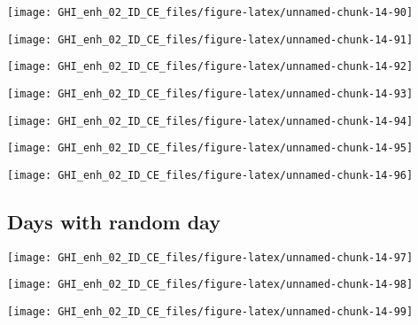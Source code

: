 \documentclass[
  10pt,
  a4paper,oneside]{article}
\begin{document}
\begin{center}\texttt{[image: GHI\_enh\_02\_ID\_CE\_files/figure-latex/unnamed-chunk-14-90]} \end{center}

\begin{center}\texttt{[image: GHI\_enh\_02\_ID\_CE\_files/figure-latex/unnamed-chunk-14-91]} \end{center}

\begin{center}\texttt{[image: GHI\_enh\_02\_ID\_CE\_files/figure-latex/unnamed-chunk-14-92]} \end{center}

\begin{center}\texttt{[image: GHI\_enh\_02\_ID\_CE\_files/figure-latex/unnamed-chunk-14-93]} \end{center}

\begin{center}\texttt{[image: GHI\_enh\_02\_ID\_CE\_files/figure-latex/unnamed-chunk-14-94]} \end{center}

\begin{center}\texttt{[image: GHI\_enh\_02\_ID\_CE\_files/figure-latex/unnamed-chunk-14-95]} \end{center}

\begin{center}\texttt{[image: GHI\_enh\_02\_ID\_CE\_files/figure-latex/unnamed-chunk-14-96]} \end{center}

\FloatBarrier

\hypertarget{days-with-random-day}{%
\subsection{Days with random day}\label{days-with-random-day}}

\begin{center}\texttt{[image: GHI\_enh\_02\_ID\_CE\_files/figure-latex/unnamed-chunk-14-97]} \end{center}

\begin{center}\texttt{[image: GHI\_enh\_02\_ID\_CE\_files/figure-latex/unnamed-chunk-14-98]} \end{center}

\begin{center}\texttt{[image: GHI\_enh\_02\_ID\_CE\_files/figure-latex/unnamed-chunk-14-99]} \end{center}
\end{document}
